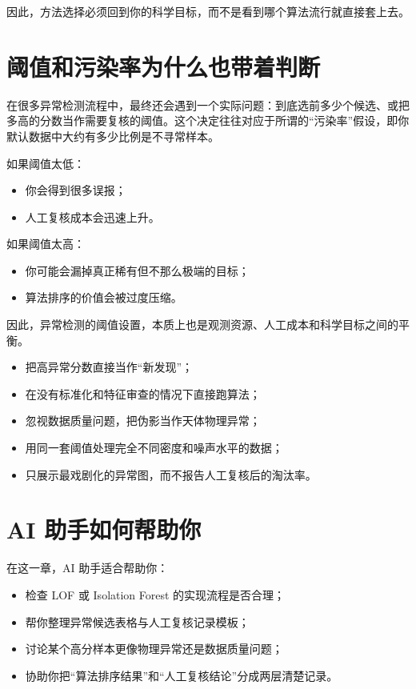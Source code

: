 因此，方法选择必须回到你的科学目标，而不是看到哪个算法流行就直接套上去。

\section{阈值和污染率为什么也带着判断}

在很多异常检测流程中，最终还会遇到一个实际问题：到底选前多少个候选、或把多高的分数当作需要复核的阈值。这个决定往往对应于所谓的“污染率”假设，即你默认数据中大约有多少比例是不寻常样本。

如果阈值太低：

\begin{itemize}
    \item 你会得到很多误报；
    \item 人工复核成本会迅速上升。
\end{itemize}

如果阈值太高：

\begin{itemize}
    \item 你可能会漏掉真正稀有但不那么极端的目标；
    \item 算法排序的价值会被过度压缩。
\end{itemize}

因此，异常检测的阈值设置，本质上也是观测资源、人工成本和科学目标之间的平衡。

\begin{warnbox}[异常检测中的常见误区]
\begin{itemize}
    \item 把高异常分数直接当作“新发现”；
    \item 在没有标准化和特征审查的情况下直接跑算法；
    \item 忽视数据质量问题，把伪影当作天体物理异常；
    \item 用同一套阈值处理完全不同密度和噪声水平的数据；
    \item 只展示最戏剧化的异常图，而不报告人工复核后的淘汰率。
\end{itemize}
\end{warnbox}

\section{AI 助手如何帮助你}

在这一章，AI 助手适合帮助你：

\begin{itemize}
    \item 检查 LOF 或 Isolation Forest 的实现流程是否合理；
    \item 帮你整理异常候选表格与人工复核记录模板；
    \item 讨论某个高分样本更像物理异常还是数据质量问题；
    \item 协助你把“算法排序结果”和“人工复核结论”分成两层清楚记录。
\end{itemize}

